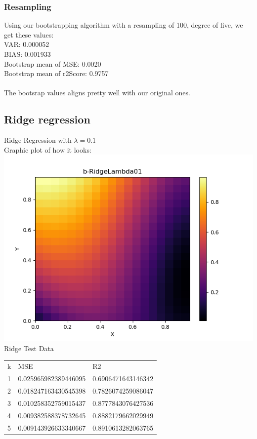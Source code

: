 \documentclass[a4paper,norsk]{article}
\begin{document}
\subsubsection{Resampling}
Using our bootstrapping algorithm with a resampling of 100, degree of five, we get these values:
\\VAR: 0.000052
\\BIAS: 0.001933
\\Bootstrap mean of MSE: 0.0020
\\Bootstrap mean of r2Score: 0.9757
\\ 
\\The bootsrap values aligns pretty well with our original ones.
\clearpage
\subsection{Ridge regression}
Ridge Regression with $\lambda = 0.1$
\\Graphic plot of how it looks:
\\ \includegraphics[scale=.7]{b-RidgeLambda01}
\\Ridge Test Data
\begin{table}[!h]
\begin{tabular}{lll}
k & MSE                   & R2                 \\
1 & 0.025965982389446095  & 0.6906471643146342 \\
2 & 0.018247163430545398  & 0.7826074259086047 \\
3 & 0.010258352759015437  & 0.8777843076427536 \\
4 & 0.009382588378732645  & 0.8882179662029949 \\
5 & 0.009143926633340667 & 0.8910613282063765
\end{tabular}
\end{table}
\end{document}
